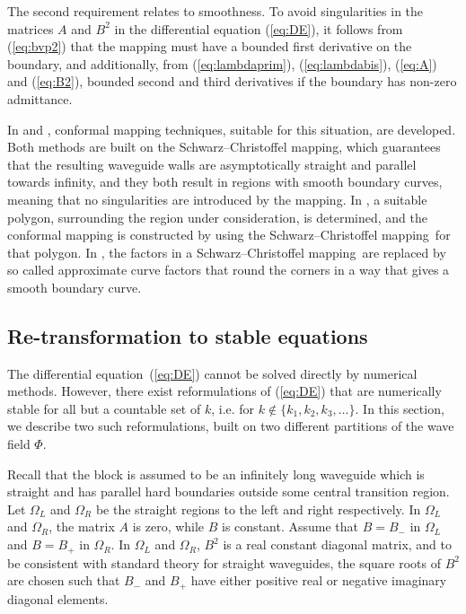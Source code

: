 \documentclass[numreferences]{kluwer}
\renewcommand{\Phi}{\varPhi}
\renewcommand{\vec}[1]{\bm{#1}}
\newcommand{\scm}{Schwarz--Chris\-tof\-fel mapping}
\renewcommand{\Phi}{\varPhi}
\begin{document}
The second requirement relates to smoothness. To avoid singularities in the matrices $A$ and
$B^2$ in the differential equation (\ref{eq:DE}), it follows from
(\ref{eq:bvp2}) that the mapping must have a bounded first derivative
on the boundary, and additionally, from (\ref{eq:lambdaprim}),
(\ref{eq:lambdabis}), (\ref{eq:A}) and (\ref{eq:B2}), bounded second
and third derivatives if the boundary has non-zero admittance.

In \cite{andersson-outpol:2008} and \cite{andersson-acf:2009},
conformal mapping techniques, suitable for this situation, are
developed. Both methods are built on the \scm, which guarantees that
the resulting waveguide walls are asymptotically straight and parallel
towards infinity, and they both result in regions with smooth boundary
curves, meaning that no singularities are introduced by the
mapping. In \cite{andersson-outpol:2008}, a suitable polygon,
surrounding the region under consideration, is determined, and the
conformal mapping is constructed by using the \scm\ for that
polygon. In \cite{andersson-acf:2009}, the factors in a \scm\ are
replaced by so called approximate curve factors that round the corners
in a way that gives a smooth boundary curve.

\subsection{Re-transformation to stable equations}
\label{sec:stableeq}
The differential equation~(\ref{eq:DE}) cannot be solved directly by
numerical methods. However, there exist reformulations of
(\ref{eq:DE}) that are numerically stable for all but a countable set
of $k$, i.e. for $k\notin\{k_1,k_2,k_3,\dots\}$. In this section, we
describe two such reformulations, built on two different partitions of
the wave field $\vec\Phi$.

Recall that the block is assumed to be an infinitely long waveguide
which is straight and has parallel hard boundaries outside some
central transition region. Let $\Omega_L$ and $\Omega_R$ be the
straight regions to the left and right respectively.  In $\Omega_L$
and $\Omega_R$, the matrix $A$ is zero, while $B$ is
constant. Assume that $B=B_-$ in $\Omega_L$ and $B=B_+$ in
$\Omega_R$. In $\Omega_L$ and $\Omega_R$, $B^2$ is a real constant
diagonal matrix, and to be consistent with standard theory for
straight waveguides, the square roots of $B^2$ are chosen such that
$B_-$ and $B_+$ have either positive real or negative imaginary
diagonal elements.
\end{document}
